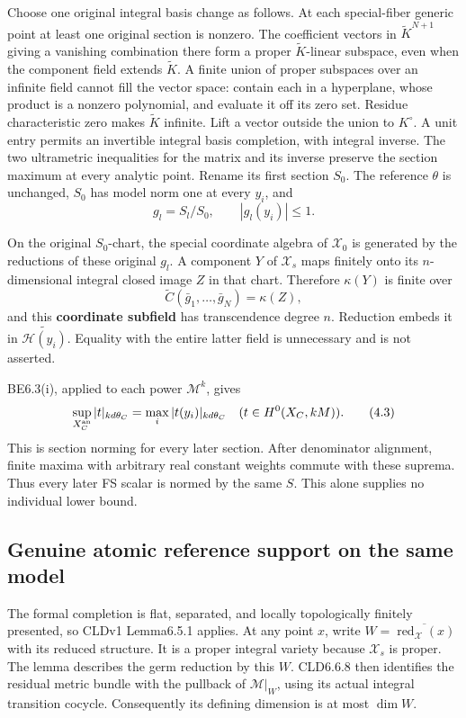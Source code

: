 \documentclass[
  11pt,
]{article}
\begin{document}
Choose one original integral basis change as follows. At each
special-fiber generic point at least one original section is nonzero.
The coefficient vectors in \(\widetilde K^{N+1}\) giving a vanishing
combination there form a proper \(\widetilde K\)-linear subspace, even
when the component field extends \(\widetilde K\). A finite union of
proper subspaces over an infinite field cannot fill the vector space:
contain each in a hyperplane, whose product is a nonzero polynomial, and
evaluate it off its zero set. Residue characteristic zero makes
\(\widetilde K\) infinite. Lift a vector outside the union to
\(K^\circ\). A unit entry permits an invertible integral basis
completion, with integral inverse. The two ultrametric inequalities for
the matrix and its inverse preserve the section maximum at every
analytic point. Rename its first section \(S_0\). The reference
\(\theta\) is unchanged, \(S_0\) has model norm one at every \(y_i\),
and \[
 g_l=S_l/S_0,\qquad |g_l(y_i)|\leq1. \tag{4.2}
\]

On the original \(S_0\)-chart, the special coordinate algebra of
\(\mathcal X_0\) is generated by the reductions of these original
\(g_l\). A component \(Y\) of \(\mathcal X_s\) maps finitely onto its
\(n\)-dimensional integral closed image \(Z\) in that chart. Therefore
\(\kappa(Y)\) is finite over \[
 \widetilde C(\bar g_1,\ldots,\bar g_N)=\kappa(Z),
\] and this \textbf{coordinate subfield} has transcendence degree \(n\).
Reduction embeds it in \(\widetilde{\mathcal H(y_i)}\). Equality with
the entire latter field is unnecessary and is not asserted.

BE6.3(i), applied to each power \(\mathcal M^k\), gives \[
 \sup_{X_C^{\rm an}}|t|_{kd\theta_C}
       =\max_i|t(y_i)|_{kd\theta_C}
 \quad(t\in H^0(X_C,kM)). \tag{4.3}
\] This is section norming for every later section. After denominator
alignment, finite maxima with arbitrary real constant weights commute
with these suprema. Thus every later FS scalar is normed by the same
\(S\). This alone supplies no individual lower bound.

\subsection{Genuine atomic reference support on the same
model}\label{genuine-atomic-reference-support-on-the-same-model}

The formal completion is flat, separated, and locally topologically
finitely presented, so CLDv1 Lemma6.5.1 applies. At any point \(x\),
write \(W=\overline{\operatorname{red}_{\mathcal X}(x)}\) with its
reduced structure. It is a proper integral variety because
\(\mathcal X_s\) is proper. The lemma describes the germ reduction by
this \(W\). CLD6.6.8 then identifies the residual metric bundle with the
pullback of \(\mathcal M|_W\), using its actual integral transition
cocycle. Consequently its defining dimension is at most \(\dim W\).
\end{document}
